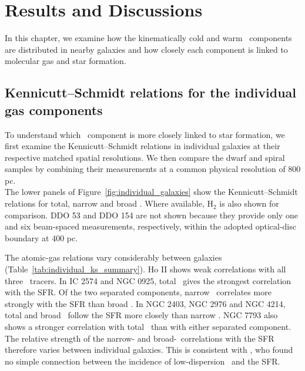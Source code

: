 
\chapter{Results and Discussions}

In this chapter, we examine how the kinematically cold and warm \HI\ components are distributed in nearby galaxies and how closely each component is linked to molecular gas and star formation.


%

\begingroup
\raggedbottom
\setlength{\intextsep}{6pt}
\section[Kennicutt--Schmidt relations for the individual gas components]{Kennicutt--Schmidt relations for the individual gas components}
\label{sec:ks_individual_results}
To understand which \HI\ component is more closely linked to star formation, we first examine the Kennicutt--Schmidt relations in individual galaxies at their respective matched spatial resolutions. We then compare the dwarf and spiral samples by combining their measurements at a common physical resolution of 800 pc.\\\indent
The lower panels of Figure~\ref{fig:individual_galaxies} show the Kennicutt--Schmidt relations for total, narrow and broad \HI. Where available, H$_2$ is also shown for comparison. DDO 53 and DDO 154 are not shown because they provide only one and six beam-spaced measurements, respectively, within the adopted optical-disc boundary at 400 pc.

The atomic-gas relations vary considerably between galaxies (Table~\ref{tab:individual_ks_summary}). Ho II shows weak correlations with all three \HI\ tracers. In IC 2574 and NGC 0925, total \HI\ gives the strongest correlation with the SFR. Of the two separated components, narrow \HI\ correlates more strongly with the SFR than broad \HI. In NGC 2403, NGC 2976 and NGC 4214, total and broad \HI\ follow the SFR more closely than narrow \HI. NGC 7793 also shows a stronger correlation with total \HI\ than with either separated component. The relative strength of the narrow- and broad-\HI\ correlations with the SFR therefore varies between individual galaxies. This is consistent with \citet{Young2003}, who found no simple connection between the incidence of low-dispersion \HI\ and the SFR.

